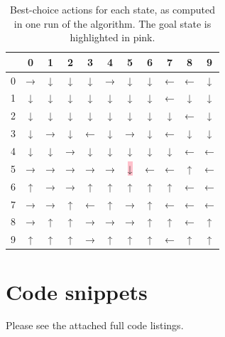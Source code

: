 \documentclass[a4paper, 11pt, twocolumn, final]{article} %
\begin{document}
\begin{table}[H]
  \centering
  \begin{tabular}{r | c c c c c c c c c c}
    \hline
      & 0 & 1 & 2 & 3 & 4 & 5 & 6 & 7 & 8 & 9 \\
    \hline
    0 & → & ↓ & ↓ & ↓ & → & ↓ & ↓ & ← & ← & ↓ \\
    1 & ↓ & ↓ & ↓ & ↓ & ↓ & ↓ & ↓ & ← & ↓ & ↓ \\
    2 & ↓ & ↓ & ↓ & ↓ & ↓ & ↓ & ↓ & ↓ & ← & ↓ \\
    3 & ↓ & → & ↓ & ← & ↓ & → & ↓ & ← & ↓ & ↓ \\
    4 & ↓ & ↓ & → & ↓ & ↓ & ↓ & ↓ & ↓ & ← & ← \\
    5 & → & → & → & → & → & \colorbox{pink}{↓} & ← & ← & ↑ & ← \\
    6 & ↑ & → & → & ↑ & ↑ & ↑ & ↑ & ↑ & ← & ← \\
    7 & → & → & ↑ & ← & ↑ & → & ↑ & ← & ← & ← \\
    8 & → & ↑ & ↑ & → & → & → & ↑ & ↑ & ← & ↑ \\
    9 & ↑ & ↑ & ↑ & → & ↑ & ↑ & ↑ & ← & ↑ & ↑ \\
    \hline
  \end{tabular}
  \caption{Best-choice actions for each state, as computed in one run of the
  algorithm.  The goal state is highlighted in pink.}
  \label{tab:computed_directions}
\end{table}

\section{Code snippets} \label{sec:code}
Please see the attached full code listings.
\end{document}
